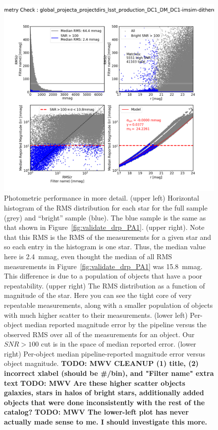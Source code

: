 \documentclass[twocolumn]{aastex62}
\begin{document}
\begin{figure}
\centering
\includegraphics[width=1.8\columnwidth]{DC1-imsim-dithered_r_check_photometry.png}
\caption{Photometric performance in more detail.  (upper left) Horizontal histogram of the RMS distribution for each star for the full sample (grey) and ``bright'' sample (blue).  The blue sample is the same as that shown in Figure~\ref{fig:validate_drp_PA1}. (upper right).  Note that this RMS is the RMS of the measurements for a given star and so each entry in the histogram is one star. Thus, the median value here is 2.4~mmag, even thought the median of all RMS measurements in Figure~\ref{fig:validate_drp_PA1} was 15.8~mmag.  This difference is due to a population of objects that have a poor repeatability. (upper right) The RMS distribution as a function of magnitude of the star.  Here you can see the tight core of very repeatable measurements, along with a smaller population of objects with much higher scatter to their measurements. (lower left) Per-object median reported magnitude error by the pipeline versus the observed RMS over all of the measurements for an object.  Our $SNR>100$ cut is in the space of median reported error. (lower right) Per-object median pipeline-reported magnitude error versus object magnitude. 
{\bf TODO: MWV CLEANUP (1) title, (2) incorrect xlabel (should be \#/bin),  and "Filter name" extra text}
{\bf TODO: MWV  Are these higher scatter objects galaxies, stars in halos of bright stars, additionally added objects that were done inconsistently with the rest of the catalog?}
{\bf TODO: MWV  The lower-left plot has never actually made sense to me.  I should investigate this more.}
}
\label{fig:validate_drp_check_photometry}
\end{figure}
\end{document}
